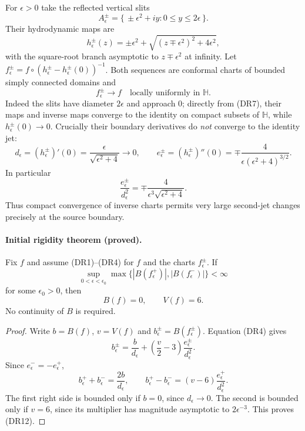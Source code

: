 \documentclass[11pt]{article}
\theoremstyle{definition}\newtheorem{definition}[theorem]{Definition}
\theoremstyle{remark}\newtheorem{remark}[theorem]{Remark}
\begin{document}
For $\epsilon>0$ take the reflected vertical slits
\[
 A_\epsilon^\pm
  =\{\,\pm\epsilon^2+iy:0\leq y\leq2\epsilon\,\}.
 \tag{DR6}
\]
Their hydrodynamic maps are
\[
 h_\epsilon^\pm(z)
 =\pm\epsilon^2+
   \sqrt{(z\mp\epsilon^2)^2+4\epsilon^2},
 \tag{DR7}
\]
with the square-root branch asymptotic to $z\mp\epsilon^2$ at infinity.
Let $f_\epsilon^\pm=f\circ
(h_\epsilon^\pm-h_\epsilon^\pm(0))^{-1}$.
Both sequences are conformal charts of bounded simply connected domains and
\[
 f_\epsilon^\pm\longrightarrow f
 \quad\text{locally uniformly in }\mathbb H.
 \tag{DR8}
\]
Indeed the slits have diameter $2\epsilon$ and approach $0$; directly from
(DR7), their maps and inverse maps converge to the identity on compact
subsets of $\mathbb H$, while $h_\epsilon^\pm(0)\to0$.
Crucially their boundary derivatives do \emph{not} converge to the identity
jet:
\[
 d_\epsilon=(h_\epsilon^\pm)'(0)
     =\frac{\epsilon}{\sqrt{\epsilon^2+4}}\longrightarrow0,
 \qquad
 e_\epsilon^\pm=(h_\epsilon^\pm)''(0)
     =\mp\frac{4}{\epsilon(\epsilon^2+4)^{3/2}}.
 \tag{DR9}
\]
In particular
\[
 \frac{e_\epsilon^\pm}{d_\epsilon^2}
 =\mp\frac{4}{\epsilon^3\sqrt{\epsilon^2+4}}.
 \tag{DR10}
\]
Thus compact convergence of inverse charts permits very large second-jet
changes precisely at the source boundary.

\paragraph{Initial rigidity theorem (proved).}
Fix $f$ and assume (DR1)--(DR4) for $f$ and the charts $f_\epsilon^\pm$.
If
\[
 \sup_{0<\epsilon<\epsilon_0}
       \max\{|B(f_\epsilon^+)|,|B(f_\epsilon^-)|\}<\infty
 \tag{DR11}
\]
for some $\epsilon_0>0$, then
\[
 B(f)=0,\qquad V(f)=6.
 \tag{DR12}
\]
No continuity of $B$ is required.

\begin{proof}
Write $b=B(f)$, $v=V(f)$ and $b_\epsilon^\pm=B(f_\epsilon^\pm)$.
Equation (DR4) gives
\[
 b_\epsilon^\pm
 =\frac b{d_\epsilon}
    +\left(\frac v2-3\right)
                       \frac{e_\epsilon^\pm}{d_\epsilon^2}.
\]
Since $e_\epsilon^-=-e_\epsilon^+$,
\[
 b_\epsilon^++b_\epsilon^-=\frac{2b}{d_\epsilon},\qquad
 b_\epsilon^+-b_\epsilon^-=
       (v-6)\frac{e_\epsilon^+}{d_\epsilon^2}.
 \tag{DR13}
\]
The first right side is bounded only if $b=0$, since
$d_\epsilon\to0$.  The second is bounded only if $v=6$, since its multiplier
has magnitude asymptotic to $2\epsilon^{-3}$.  This proves (DR12).
\end{proof}
\end{document}
